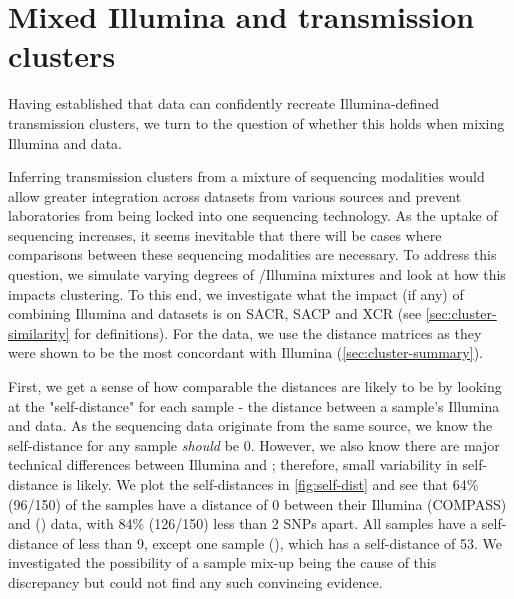 \section{Mixed Illumina and \ont{} transmission clusters}
\label{sec:mixed-clustering}

Having established that \ont{} data can confidently recreate Illumina-defined transmission clusters, we turn to the question of whether this holds when mixing Illumina and \ont{} data. 

Inferring transmission clusters from a mixture of sequencing modalities would allow greater integration across datasets from various sources and prevent laboratories from being locked into one sequencing technology. As the uptake of \ont{} sequencing increases, it seems inevitable that there will be cases where comparisons between these sequencing modalities are necessary. To address this question, we simulate varying degrees of \ont{}/Illumina mixtures and look at how this impacts clustering. To this end, we investigate what the impact (if any) of combining Illumina and \ont{} datasets is on SACR, SACP and XCR (see \autoref{sec:cluster-similarity} for definitions). For the \ont{} data, we use the \bcftools{} distance matrices as they were shown to be the most concordant with Illumina (\autoref{sec:cluster-summary}).

First, we get a sense of how comparable the distances are likely to be by looking at the "self-distance" for each sample - the distance between a sample's Illumina and \ont{} data.  As the sequencing data originate from the same source, we know the self-distance for any sample \emph{should} be 0. However, we also know there are major technical differences between Illumina and \ont{}; therefore, small variability in self-distance is likely. We plot the self-distances in \autoref{fig:self-dist} and see that 64\% (96/150) of the samples have a distance of 0 between their Illumina (COMPASS) and \ont{} (\bcftools{}) data, with 84\% (126/150) less than 2 SNPs apart. All samples have a self-distance of less than 9, except one sample (), which has a self-distance of 53. We investigated the possibility of a sample mix-up being the cause of this discrepancy but could not find any such convincing evidence. 

